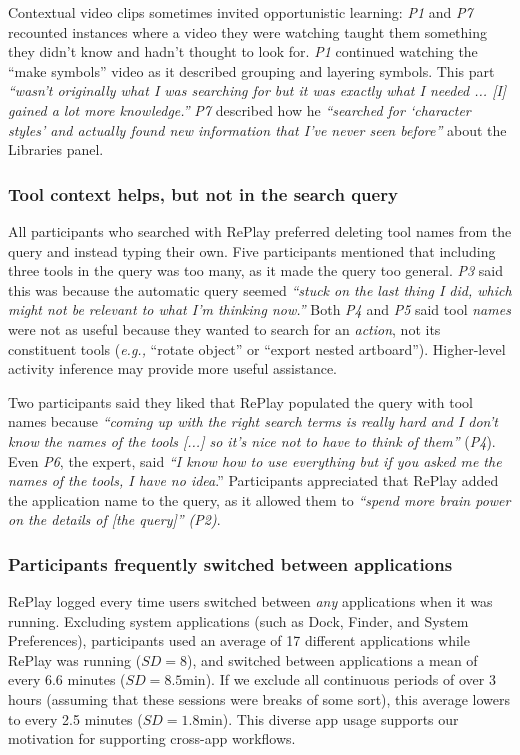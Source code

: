 Contextual video clips sometimes invited opportunistic learning: \textit{P1} and \textit{P7} recounted instances where a video they were watching taught them something they didn't know and hadn't thought to look for. \textit{P1} continued watching the ``make symbols'' video as it described grouping and layering symbols. This part \textit{``wasn't originally what I was searching for but it was exactly what I needed ... [I] gained a lot more knowledge.''} \textit{P7} described how he \textit{``searched for `character styles' and actually found new information that I've never seen before''} about the Libraries panel.

\subsubsection{Tool context helps, but not in the search query}
All participants who searched with RePlay preferred deleting tool names from the query and instead typing their own. Five participants mentioned that including three tools in the query was too many, as it made the query too general. \textit{P3} said this was because the automatic query seemed \textit{``stuck on the last thing I did, which might not be relevant to what I'm thinking now.''} Both \textit{P4} and \textit{P5} said tool \textit{names} were not as useful because they wanted to search for an \textit{action}, not its constituent tools (\textit{e.g.,} ``rotate object'' or ``export nested artboard''). Higher-level activity inference may provide more useful assistance.

Two participants said they liked that RePlay populated the query with tool names because \textit{``coming up with the right search terms is really hard and I don't know the names of the tools [...] so it's nice not to have to think of them''} (\textit{P4}). Even \textit{P6}, the expert, said \textit{``I know how to use everything but if you asked me the names of the tools, I have no idea}.'' Participants appreciated that RePlay added the application name to the query, as it allowed them to \textit{``spend more brain power on the details of [the query]'' (P2)}. 

\subsubsection{Participants frequently switched between applications}
RePlay logged every time users switched between \textit{any} applications when it was running. Excluding system applications (such as Dock, Finder, and System Preferences), participants used an average of 17 different applications while RePlay was running ($SD\!=\!8$), and switched between applications a mean of every 6.6 minutes ($SD\!=\!8.5$min). If we exclude all continuous periods of over 3 hours (assuming that these sessions were breaks of some sort), this average lowers to every 2.5 minutes ($SD\!=\!1.8$min). This diverse app usage supports our motivation for supporting cross-app workflows.

